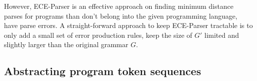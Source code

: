 
However, ECE-Parser is an effective approach on finding minimum distance parses for
programs than don't belong into the given programming language, \ie have parse
errors. A straight-forward approach to keep ECE-Parser tractable is to only add a
small set of error production rules, \ie keep the size of $G'$ limited and
slightly larger than the original grammar $G$.

\subsection{Abstracting program token sequences}
\label{sec:overview:abstraction}

